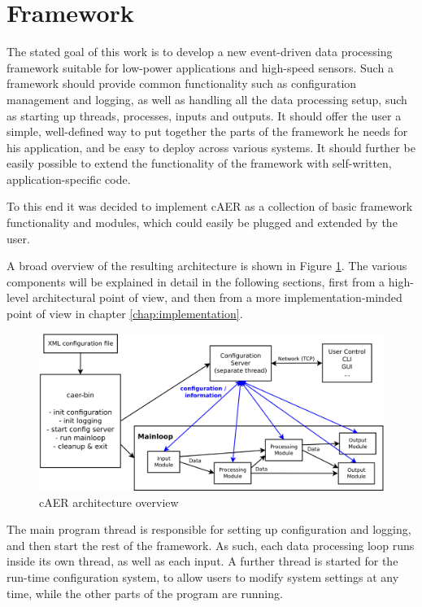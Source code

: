 \documentclass[a4paper,12pt]{report}
\begin{document}
\section{Framework} \label{sec:framework}

The stated goal of this work is to develop a new event-driven data processing framework suitable for low-power applications and high-speed sensors.
Such a framework should provide common functionality such as configuration management and logging, as well as handling all the data processing setup, such as starting up threads, processes, inputs and outputs.
It should offer the user a simple, well-defined way to put together the parts of the framework he needs for his application, and be easy to deploy across various systems.
It should further be easily possible to extend the functionality of the framework with self-written, application-specific code.

To this end it was decided to implement cAER as a collection of basic framework functionality and modules, which could easily be plugged and extended by the user.

A broad overview of the resulting architecture is shown in Figure \ref{fig:caer_architecture}. The various components will be explained in detail in the following sections, first from a high-level architectural point of view, and then from a more implementation-minded point of view in chapter \ref{chap:implementation}.

\begin{figure}[H]
\begin{center}
\includegraphics[width=\textwidth]{caer_architecture}
\caption{cAER architecture overview}
\label{fig:caer_architecture}
\end{center}
\end{figure}

The main program thread is responsible for setting up configuration and logging, and then start the rest of the framework. 
As such, each data processing loop runs inside its own thread, as well as each input.
A further thread is started for the run-time configuration system, to allow users to modify system settings at any time, while the other parts of the program are running.
\end{document}
